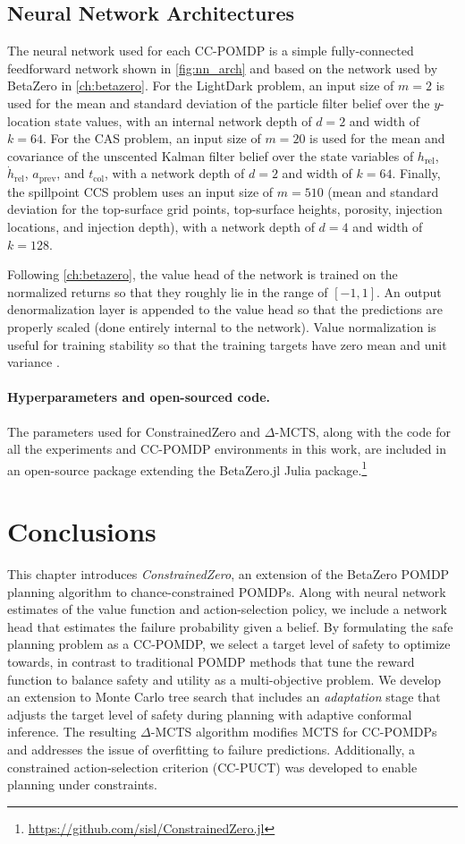 \subsection{Neural Network Architectures}
The neural network used for each CC-POMDP is a simple fully-connected feedforward network shown in \cref{fig:nn_arch} and based on the network used by BetaZero in \cref{ch:betazero}.
For the LightDark problem, an input size of $m=2$ is used for the mean and standard deviation of the particle filter belief over the $y$-location state values, with an internal network depth of $d=2$ and width of $k=64$.
For the CAS problem, an input size of $m=20$ is used for the mean and covariance of the unscented Kalman filter belief over the state variables of $h_\text{rel}$, $\dot{h}_\text{rel}$, $a_\text{prev}$, and $t_\text{col}$, with a network depth of $d=2$ and width of $k=64$.
Finally, the spillpoint CCS problem uses an input size of $m=510$ (mean and standard deviation for the top-surface grid points, top-surface heights, porosity, injection locations, and injection depth), with a network depth of $d=4$ and width of $k=128$.

Following \cref{ch:betazero}, the value head of the network is trained on the normalized returns so that they roughly lie in the range of $[-1, 1]$.
An output denormalization layer is appended to the value head so that the predictions are properly scaled (done entirely internal to the network).
Value normalization is useful for training stability so that the training targets have zero mean and unit variance \cite{lecun2002efficient}.


\paragraph{Hyperparameters and open-sourced code.}
The parameters used for ConstrainedZero and $\Delta$-MCTS, along with the code for all the experiments and CC-POMDP environments in this work, are included in an open-source package extending the BetaZero.jl Julia package.\footnote{\url{https://github.com/sisl/ConstrainedZero.jl}}


\section{Conclusions}
This chapter introduces \textit{ConstrainedZero}, an extension of the BetaZero POMDP planning algorithm to chance-constrained POMDPs.
Along with neural network estimates of the value function and action-selection policy, we include a network head that estimates the failure probability given a belief.
By formulating the safe planning problem as a CC-POMDP, we select a target level of safety to optimize towards, in contrast to traditional POMDP methods that tune the reward function to balance safety and utility as a multi-objective problem.
We develop an extension to Monte Carlo tree search that includes an \textit{adaptation} stage that adjusts the target level of safety during planning with adaptive conformal inference.
The resulting $\Delta$-MCTS algorithm modifies MCTS for CC-POMDPs and addresses the issue of overfitting to failure predictions.
Additionally, a constrained action-selection criterion (CC-PUCT) was developed to enable planning under constraints.


